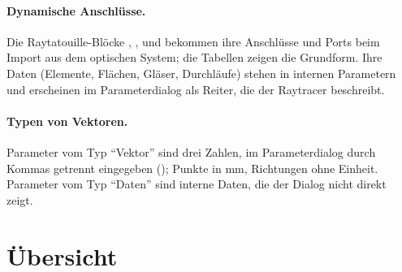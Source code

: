 \paragraph{Dynamische Anschlüsse.} Die Raytatouille-Blöcke ,
,  und  bekommen ihre Anschlüsse und Ports
beim Import aus dem optischen System; die Tabellen zeigen die Grundform. Ihre Daten (Elemente,
Flächen, Gläser, Durchläufe) stehen in internen Parametern und erscheinen im Parameterdialog als
Reiter, die der Raytracer beschreibt.

\paragraph{Typen von Vektoren.} Parameter vom Typ \enquote{Vektor} sind drei Zahlen, im
Parameterdialog durch Kommas getrennt eingegeben (); Punkte in mm, Richtungen
ohne Einheit. Parameter vom Typ \enquote{Daten} sind interne Daten, die der
Dialog nicht direkt zeigt.

\section{Übersicht}\label{sec:bloecke-uebersicht}

